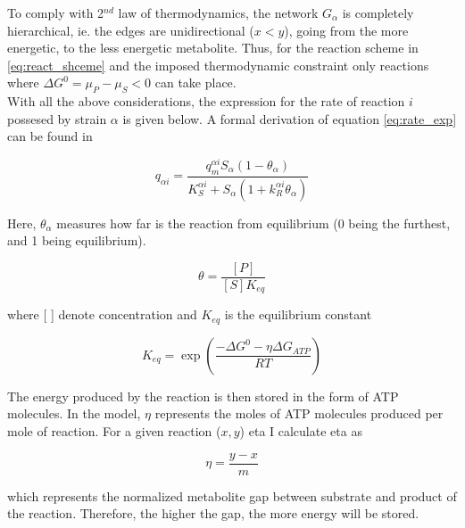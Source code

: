 \documentclass[titlepage,11pt]{article}
\begin{document}
\begin{linenumbers}
\begin{singlespace}
To comply with 2$ ^{nd} $ law of thermodynamics, the network $ G_{\alpha} $ is completely hierarchical, ie. the edges are unidirectional ($ x < y $), going from the more energetic, to the less energetic metabolite. Thus, for the reaction scheme in \ref{eq:react_shceme} and the imposed thermodynamic constraint only reactions where $ \Delta G^0 = \mu_P - \mu_S < 0 $ can take place.\\
With all the above considerations, the expression for the rate of reaction $ i $ possesed by strain $ \alpha $ is given below. A formal derivation of equation \ref{eq:rate_exp} can be found in \citet{Hoh2000}
\begin{linenomath*}	
	\begin{equation}\label{eq:rate_exp}
	q_{\alpha i} = \frac{q_m^{\alpha i}S_{\alpha}(1 - \theta_{\alpha})}{K_S^{\alpha i} + S_{\alpha}(1 + k_R^{\alpha i}\theta_{\alpha})}
	\end{equation}
\end{linenomath*}
Here, $ \theta_{\alpha} $ measures how far is the reaction from equilibrium (0 being the furthest, and 1 being equilibrium).
\begin{linenomath*}	
	\begin{equation}
	\theta = \frac{[P]}{[S]K_{eq}}
	\end{equation}	
\end{linenomath*}
where [   ] denote concentration and $ K_{eq} $ is the equilibrium constant
\begin{linenomath*}	
	\begin{equation}
	K_{eq}= \exp\left(\frac{-\Delta G^{0} - \eta\Delta G_{ATP}}{RT}\right)
	\end{equation}
\end{linenomath*}
The energy produced by the reaction is then stored in the form of ATP molecules. In the model, $ \eta $ represents the moles of ATP molecules produced per mole of reaction. For a given reaction ($ x, y $) eta I calculate eta as 
\begin{linenomath*}	
	\begin{equation}
	\eta = \frac{y - x}{m}
	\end{equation}
\end{linenomath*}
which represents the normalized metabolite gap between substrate and product of the reaction. Therefore, the higher the gap, the more energy will be stored.\\

\end{singlespace}
\end{linenumbers}
\end{document}
